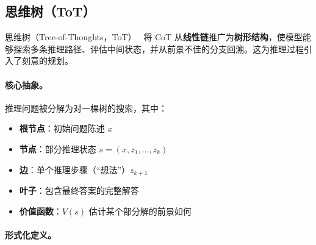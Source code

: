 \subsection{思维树（ToT）}
\label{subsec:tot_method}

思维树（Tree-of-Thoughts，ToT）~\cite{yao2023tree} 将 CoT 从\textbf{线性链}推广为\textbf{树形结构}，使模型能够探索多条推理路径、评估中间状态，并从前景不佳的分支回溯。这为推理过程引入了刻意的规划。

\paragraph{核心抽象。}
\label{core-abstraction.}

推理问题被分解为对一棵树的搜索，其中：

\begin{itemize}
  \item \textbf{根节点}：初始问题陈述 $x$
  \item \textbf{节点}：部分推理状态 $s = (x, z_1, \ldots, z_k)$
  \item \textbf{边}：单个推理步骤（“想法”）$z_{k+1}$
  \item \textbf{叶子}：包含最终答案的完整解答
  \item \textbf{价值函数}：$V(s)$ 估计某个部分解的前景如何
\end{itemize}

\paragraph{形式化定义。}
\label{formal-definition.}

